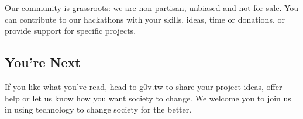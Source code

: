 Our community is grassroots: we are non-partisan, unbiased and not for sale. You can contribute to our hackathons with your skills, ideas, time or donations, or provide support for specific projects.

\subsection{You’re Next}

If you like what you’ve read, head to g0v.tw to share your project ideas, offer help or let us know how you want society to change. We welcome you to join us in using technology to change society for the better.

\EndChapter

